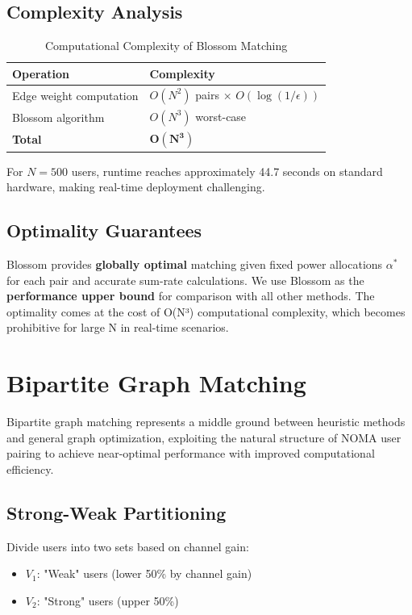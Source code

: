 \subsection{Complexity Analysis}

\begin{table}[H]
\centering
\begin{tabular}{ll}
\toprule
\textbf{Operation} & \textbf{Complexity} \\
\midrule
Edge weight computation & $O(N^2)$ pairs × $O(\log(1/\epsilon))$ \\
Blossom algorithm & $O(N^3)$ worst-case \\
\textbf{Total} & $\boldsymbol{O(N^3)}$ \\
\bottomrule
\end{tabular}
\caption{Computational Complexity of Blossom Matching}
\end{table}

For $N=500$ users, runtime reaches approximately 44.7 seconds on standard hardware, making real-time deployment challenging.

\subsection{Optimality Guarantees}

Blossom provides \textbf{globally optimal} matching given fixed power allocations $\alpha^*$ for each pair and accurate sum-rate calculations. We use Blossom as the \textbf{performance upper bound} for comparison with all other methods. The optimality comes at the cost of O(N³) computational complexity, which becomes prohibitive for large N in real-time scenarios.

\section{Bipartite Graph Matching}

Bipartite graph matching represents a middle ground between heuristic methods and general graph optimization, exploiting the natural structure of NOMA user pairing to achieve near-optimal performance with improved computational efficiency.

\subsection{Strong-Weak Partitioning}

Divide users into two sets based on channel gain:
\begin{itemize}
    \item $V_1$: "Weak" users (lower 50\% by channel gain)
    \item $V_2$: "Strong" users (upper 50\%)
\end{itemize}

